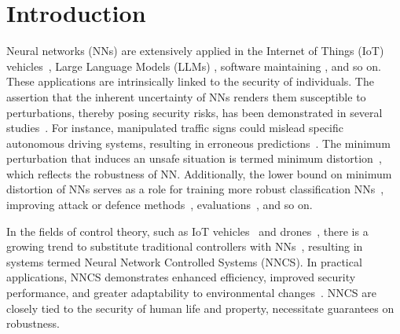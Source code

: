 \documentclass[conference]{IEEEtran}
\newcommand{\nncs}{\textsc{NNCS}\xspace}
\begin{document}
\section{Introduction}
Neural networks (NNs) are 
extensively applied in the 
Internet of Things (IoT) 
vehicles~\cite{pacheco2016iot,naveed2024towards}, 
Large Language Models (LLMs) 
\cite{morales2024dsl,chen2023automated}, 
software maintaining  
\cite{ayoughi2024enhancing,weber2024model}, and so on. 
These applications are intrinsically linked to 
the security of individuals.
The assertion that the inherent uncertainty of 
NNs renders them susceptible to perturbations, 
thereby posing security risks, 
has been demonstrated in several 
studies~\cite{kaufmann2020deep,madry2017towards}.
For instance, manipulated traffic signs could mislead specific autonomous driving systems, 
resulting in erroneous 
predictions~\cite{morgulis2019fooling}. 
The minimum perturbation that 
induces an unsafe situation 
is termed minimum 
distortion~\cite{weng2018evaluating}, which 
reflects the robustness of NN. 
Additionally, the lower bound on 
minimum distortion of NNs 
serves as a role for training more robust 
classification NNs~\cite{silva2020opportunities,amini2021robust,zhou2022adversarial,wang2024survey}, 
improving attack or defence methods~\cite{bai2021recent,zhao2024attack}, 
evaluations~\cite{weng2018evaluating}, and so on. 


In the fields of control theory, 
such as IoT vehicles~\cite{pacheco2016iot,sathiyanarayanan2018smart} 
and drones~\cite{hassanalian2017classifications,saunders2024autonomous}, 
there is a growing trend to substitute traditional 
controllers with 
NNs~\cite{nubert2020safe,abu2022deep,kohler2020computationally}, 
resulting in systems termed Neural 
Network Controlled Systems (\nncs).
In practical applications, \nncs demonstrates 
enhanced efficiency, improved security performance, 
and greater adaptability to environmental 
changes~\cite{liu2023modeling,kohler2020computationally}.
\nncs 
are closely tied to the security of 
human life and property, 
necessitate guarantees on robustness.
\end{document}
